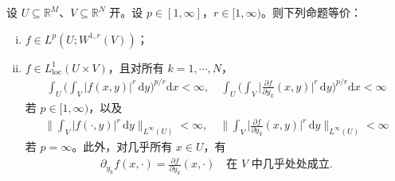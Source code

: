 \documentclass[../../main.tex]{subfiles}%
\begin{document}
\begin{proposition}\label{proposition:ch04-Sobolev嵌入}
设 $U\subseteq\mathbb{R}^M$、$V\subseteq\mathbb{R}^N$ 开。设 $p\in[1,\infty]$，$r\in[1,\infty)$。则下列命题等价：
\begin{enumerate}[(i)]
\item\label{item:ch04-Sobolev嵌入-i} $f\in L^p(U;W^{1,r}(V))$；
\item\label{item:ch04-Sobolev嵌入-ii} $f\in L^1_{\mathrm{loc}}(U\times V)$，且对所有 $k=1,\cdots ,N$，
\begin{align}
\int_U\Big(\int_V|f(x,y)|^r\,\mathrm{d}y\Big)^{p/r}\mathrm{d}x<\infty,\quad
\int_U\Big(\int_V\Big|\frac{\partial f}{\partial y_k}(x,y)\Big|^r\,\mathrm{d}y\Big)^{p/r}\mathrm{d}x<\infty \label{align:ch04-4.124a}
\end{align}
若 $p\in[1,\infty)$，以及
\begin{align}
\Big\|\int_V|f(\cdot,y)|^r\,\mathrm{d}y\Big\|_{L^\infty(U)}<\infty,\quad
\Big\|\int_V\Big|\frac{\partial f}{\partial y_k}(x,y)\Big|^r\,\mathrm{d}y\Big\|_{L^\infty(U)}<\infty \label{align:ch04-4.124b}
\end{align}
若 $p=\infty$。此外，对几乎所有 $x\in U$，有
\begin{align}
\partial_{y_k}f(x,\cdot)=\frac{\partial f}{\partial y_k}(x,\cdot)\quad\text{在 }V\text{ 中几乎处处成立}. \label{align:ch04-4.125}
\end{align}
\end{enumerate}
\end{proposition}
\end{document}
